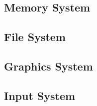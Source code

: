 \subsection{Memory System}
\subsection{File System}
\subsection{Graphics System}


\subsection{Input System}